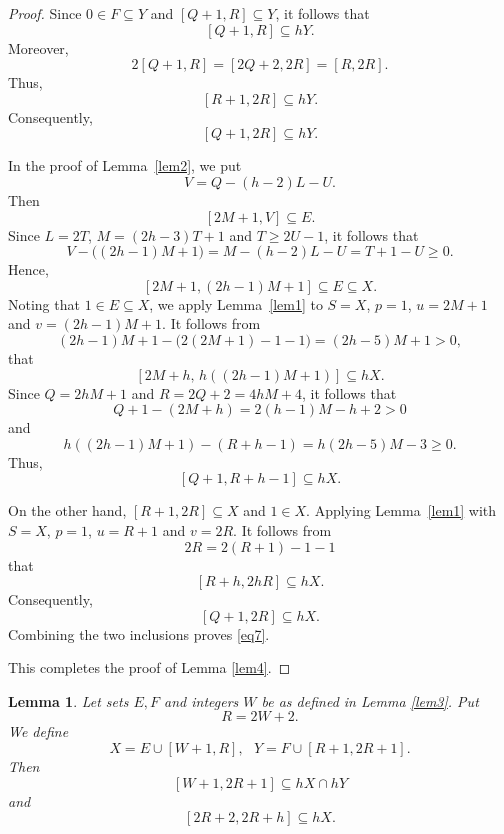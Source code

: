 \documentclass[reqno,12pt,twoside]{article}
\numberwithin{equation}{section}
\newtheorem{lemma}[theorem]{Lemma}
\begin{document}
\begin{proof}
Since $0\in F\subseteq Y$ and $[Q+1,R]\subseteq Y$, it follows that
\[
 [Q+1,R]\subseteq hY.
\]
Moreover,
\[
 2[Q+1,R]=[2Q+2,2R]=[R,2R].
\]
Thus, 
\[
 [R+1,2R]\subseteq hY.
\]
Consequently,
\[
 [Q+1,2R]\subseteq hY.
\]

In the proof of Lemma~\ref{lem2}, we put
\[
 V=Q-(h-2)L-U.
\]
Then
\[
 [2M+1,V]\subseteq E.
\]
Since $L=2T$, $M=(2h-3)T+1$ and $T\ge2U-1$, it follows that
\[
 V-\bigl((2h-1)M+1\bigr)
 =M-(h-2)L-U=T+1-U\ge0.
\]
Hence,
\[
 [2M+1,(2h-1)M+1]\subseteq E\subseteq X.
\]
Noting that $1\in E\subseteq X$, we apply Lemma~\ref{lem1} to $S=X$, $p=1$,
$u=2M+1$ and $v=(2h-1)M+1$. It follows from
\[
 (2h-1)M+1-\bigl(2(2M+1)-1-1\bigr)
 =(2h-5)M+1>0,
\]
that
\[
 [2M+h,\,h((2h-1)M+1)]\subseteq hX.
\]
Since $Q=2hM+1$ and $R=2Q+2=4hM+4$, it follows that
\[
 Q+1-(2M+h)=2(h-1)M-h+2>0
\]
and
\[
 h((2h-1)M+1)-(R+h-1)=h(2h-5)M-3\ge0.
\]
Thus,
\[
 [Q+1,R+h-1]\subseteq hX.
\]

On the other hand, $[R+1,2R]\subseteq X$ and $1\in X$. Applying Lemma~\ref{lem1}
with $S=X$, $p=1$, $u=R+1$ and $v=2R$. It follows from
\[
 2R=2(R+1)-1-1
\]
that
\[
 [R+h,2hR]\subseteq hX.
\]
Consequently,
\[
 [Q+1,2R]\subseteq hX.
\]
Combining the two inclusions proves \eqref{eq7}. 

This completes the proof of Lemma \ref{lem4}.
\end{proof}

\begin{lemma}\label{lem5}
Let sets $E,F$ and integers $W$ be as defined in Lemma \ref{lem3}. Put 
\[
 R=2W+2.
\]
We define
\[
X=E\cup [W+1,R],~~~Y=F\cup [R+1,2R+1].
\]
Then
\begin{equation}\label{eq8}
[W+1,2R+1]\subseteq hX\cap hY
\end{equation}
and
\begin{equation}\label{eq9}
[2R+2,2R+h]\subseteq hX.
\end{equation}
\end{lemma}
\end{document}
